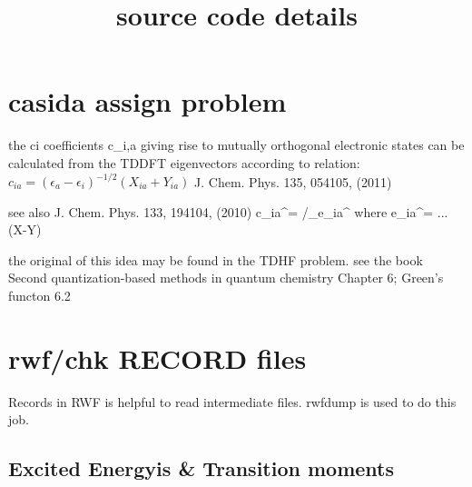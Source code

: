 \documentclass{article}
\title{source code details}
\begin{document}
\maketitle
\tableofcontent

\section{casida assign problem}
the ci coefficients c_{i,a} giving rise to mutually orthogonal electronic states can be calculated from the TDDFT eigenvectors according to
relation: $ c_{ia} = (\epsilon_a-\epsilon_i)^{-1/2}(X_{ia}+Y_{ia}) $
J. Chem. Phys. 135, 054105, (2011)

see also J. Chem. Phys. 133, 194104, (2010)
c_{ia}^\alpha = /\omega_\alpha e_{ia}^\alpha
where e_{ia}^\alpha = ...(X-Y)

the original of this idea may be found in the TDHF problem.
see the book
Second quantization-based methods in quantum chemistry
Chapter 6; Green's functon 6.2 


\section{rwf/chk RECORD files}
	Records in RWF is helpful to read intermediate files.
	rwfdump is used to do this job.
	\subsection{Excited Energyis & Transition moments}
	
\end{document}
